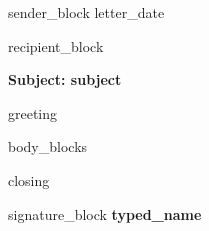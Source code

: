 \documentclass[a4paper,10pt]{article}
\begin{document}
\begin{flushright}
{{sender_block}}
{{letter_date}}
\end{flushright}

\vspace{1cm}

{{recipient_block}}

\textbf{Subject: {{subject}}}

{{greeting}}

{{body_blocks}}

{{closing}}

{{signature_block}}
\textbf{{typed_name}}
\end{document}
